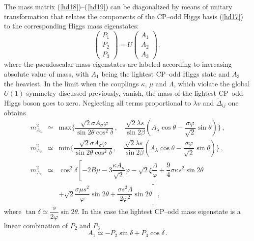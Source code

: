 \documentclass[12pt,a4paper]{article}
\newcommand{\be}{\begin{equation}}
\newcommand{\ee}{\end{equation}}
\newcommand{\ba}{\begin{array}}
\newcommand{\ea}{\end{array}}
\begin{document}
The mass matrix (\ref{hd18})--(\ref{hd19}) can be diagonalized by means of unitary transformation that relates the components of the CP--odd
Higgs basis (\ref{hd17}) to the corresponding Higgs mass eigenstates:
\be
\left(
\begin{array}{c}
P_1\\ P_2\\ P_3
\end{array}
\right)=
U
\left(
\begin{array}{c}
A_1 \\ A_2\\ A_3
\end{array}
\right)\,,
\label{hd20}
\ee
where the pseudoscalar mass eigenstates are labeled according to increasing absolute value of mass, with $A_1$ being the lightest
CP--odd Higgs state and $A_3$ the heaviest. In the limit when the couplings $\kappa$, $\mu$ and $\Lambda$, which violate the global $U(1)$
symmetry discussed previously, vanish, the mass of the lightest CP--odd Higgs boson goes to zero. Neglecting all terms proportional to $\lambda v$
and $\tilde{\Delta}_{ij}$ one obtains
\be
\ba{lcl}
m^2_{A_3} & \simeq & \mbox{max} \biggl\{\dfrac{\sqrt{2}\sigma A_{\sigma} \varphi}{\sin 2\theta \cos^2 \delta}\,,\quad
\dfrac{\sqrt{2}\lambda s}{\sin 2\beta}\left(A_{\lambda} \cos\theta - \dfrac{\sigma \varphi}{\sqrt{2}}\sin\theta\right) \biggr\}\,,\\[3mm]
m^2_{A_2} & \simeq & \mbox{min} \biggl\{\dfrac{\sqrt{2}\sigma A_{\sigma} \varphi}{\sin 2\theta \cos^2 \delta}\,,\quad
\dfrac{\sqrt{2}\lambda s}{\sin 2\beta}\left(A_{\lambda} \cos\theta - \dfrac{\sigma \varphi}{\sqrt{2}}\sin\theta\right)\biggr\}\,,\\[3mm]
m^2_{A_1} & \simeq & \cos^2 \delta \left[- 2 B\mu -3\dfrac{\kappa A_{\kappa}}{\sqrt{2}}\varphi
- \sqrt{2}\xi \dfrac{\Lambda}{\varphi} + \dfrac{9}{4} \sigma\kappa s^2 \sin 2\theta \right.\\[3mm]
&&\left. + \sqrt{2} \dfrac{\sigma\mu s^2}{\varphi} \sin 2\theta + \dfrac{\sigma s^2 \Lambda}{2 \varphi^2} \sin 2\theta\right]\,,
\ea
\label{hd21}
\ee
where $\tan\delta \simeq \dfrac{s}{2\varphi}\sin 2\theta$. In this case the lightest CP--odd mass eigenstate is a linear combination of
$P_2$ and $P_3$
 \be
A_1 \simeq  - P_2 \sin\delta + P_3 \cos\delta\,.
\label{hd22}
\ee
\end{document}
